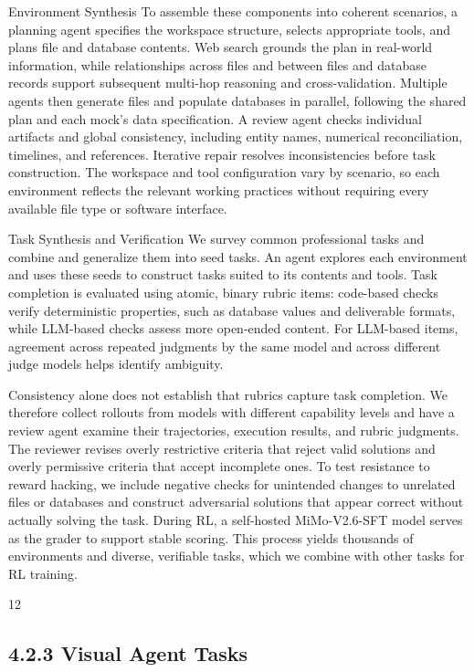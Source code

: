 \documentclass[
  10
]{article}
\begin{document}
Environment Synthesis To assemble these components into coherent
scenarios, a planning agent specifies the workspace structure, selects
appropriate tools, and plans file and database contents. Web search
grounds the plan in real-world information, while relationships across
files and between files and database records support subsequent
multi-hop reasoning and cross-validation. Multiple agents then generate
files and populate databases in parallel, following the shared plan and
each mock's data specification. A review agent checks individual
artifacts and global consistency, including entity names, numerical
reconciliation, timelines, and references. Iterative repair resolves
inconsistencies before task construction. The workspace and tool
configuration vary by scenario, so each environment reflects the
relevant working practices without requiring every available file type
or software interface.

Task Synthesis and Verification We survey common professional tasks and
combine and generalize them into seed tasks. An agent explores each
environment and uses these seeds to construct tasks suited to its
contents and tools. Task completion is evaluated using atomic, binary
rubric items: code-based checks verify deterministic properties, such as
database values and deliverable formats, while LLM-based checks assess
more open-ended content. For LLM-based items, agreement across repeated
judgments by the same model and across different judge models helps
identify ambiguity.

Consistency alone does not establish that rubrics capture task
completion. We therefore collect rollouts from models with different
capability levels and have a review agent examine their trajectories,
execution results, and rubric judgments. The reviewer revises overly
restrictive criteria that reject valid solutions and overly permissive
criteria that accept incomplete ones. To test resistance to reward
hacking, we include negative checks for unintended changes to unrelated
files or databases and construct adversarial solutions that appear
correct without actually solving the task. During RL, a self-hosted
MiMo-V2.6-SFT model serves as the grader to support stable scoring. This
process yields thousands of environments and diverse, verifiable tasks,
which we combine with other tasks for RL training.

12

\subsection{4.2.3 Visual Agent Tasks}\label{visual-agent-tasks}
\end{document}

